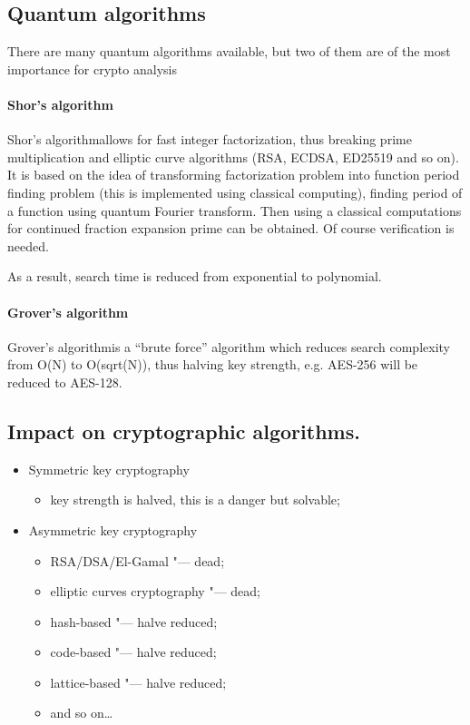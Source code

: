 \documentclass[10pt, a5paper]{article}
\begin{document}
\subsection*{Quantum algorithms}

There are many quantum algorithms available, but two of them are of the most importance for crypto analysis

\paragraph{Shor's algorithm}

Shor's algorithm\footnotemark[2] allows for fast integer \linebreak factorization, thus breaking prime multiplication and elliptic curve \linebreak algorithms (RSA, ECDSA, ED25519 and so on). It is based on the idea of transforming factorization problem into function period finding problem (this is implemented using classical computing), finding period of a function using quantum Fourier transform. Then using a classical computations for continued fraction expansion prime can be obtained. Of course verification is needed.

As a result, search time is reduced from exponential to polynomial.

\paragraph{Grover's algorithm}

Grover's algorithm\footnotemark[3] is a ``brute force'' algorithm which reduces search complexity from O(N) to O(sqrt(N)), thus halving key strength, e.g. AES-256 will be reduced to AES-128.

\subsection*{Impact on cryptographic algorithms.}

\begin{itemize}
  \item Symmetric key cryptography\begin{itemize}
  \item key strength is halved, this is a danger but solvable;
\end{itemize}


  \item Asymmetric key cryptography\begin{itemize}
  \item RSA/DSA/El-Gamal "--- dead;
  \item elliptic curves cryptography "--- dead;
  \item hash-based "--- halve reduced;
  \item code-based "--- halve reduced;
  \item lattice-based "--- halve reduced;
  \item and so on\ldots{}
\end{itemize}


\end{itemize}
\end{document}
